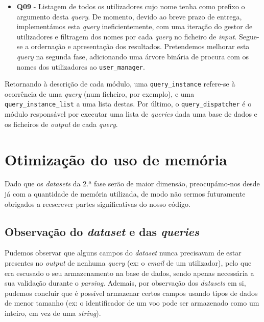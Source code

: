 \documentclass[12pt, a4paper]{article}
\begin{document}
\begin{itemize}
    \item \textbf{Q09} - Listagem de todos os utilizadores cujo nome tenha como prefixo o argumento
                         desta \emph{query}. De momento, devido ao breve prazo de entrega,
                         implementámos esta \emph{query} ineficientemente, com uma iteração do
                         gestor de utilizadores e filtragem dos nomes por cada \emph{query} no
                         ficheiro de \emph{input}. Segue-se a ordernação e apresentação dos
                         resultados. Pretendemos melhorar esta \emph{query} na segunda fase,
                         adicionando uma árvore binária de procura com os nomes dos utilizadores
                         ao \texttt{user\_manager}.
\end{itemize}

Retornando à descrição de cada módulo, uma \texttt{query\_instance} refere-se à ocorrência de uma
\emph{query} (num ficheiro, por exemplo), e uma \texttt{query\_instance\_list} a uma lista destas.
Por último, o \texttt{query\_dispatcher} é o módulo responsável por executar uma lista de
\emph{queries} dada uma base de dados e os ficheiros de \emph{output} de cada \emph{query}.

\section{Otimização do uso de memória}

Dado que os \emph{datasets} da 2.ª fase serão de maior dimensão, preocupámo-nos desde já com a
quantidade de memória utilizada, de modo não sermos futuramente obrigados a reescrever partes
significativas do nosso código.

\subsection{Observação do \emph{dataset} e das \emph{queries}}

Pudemos observar que alguns campos do \emph{dataset} nunca precisavam de estar presentes no
\emph{output} de nenhuma \emph{query} (ex: o \emph{email} de um utilizador), pelo que era escusado
o seu armazenamento na base de dados, sendo apenas necessária a sua validação durante o
\emph{parsing}. Ademais, por observação dos \emph{datasets} em si, pudemos concluir que é possível
armazenar certos campos usando tipos de dados de menor tamanho (ex: o identificador de um voo
pode ser armazenado como um inteiro, em vez de uma \emph{string}).
\end{document}
